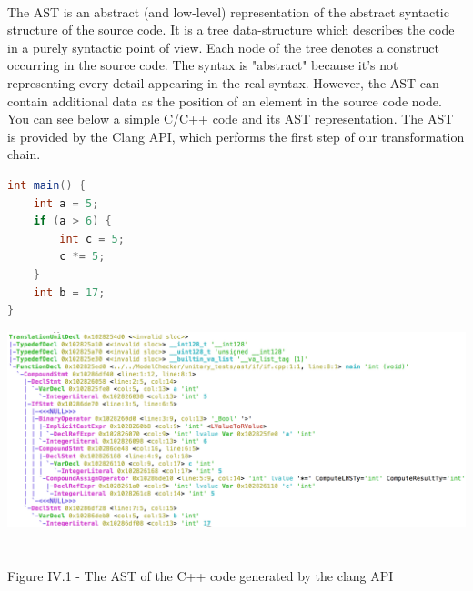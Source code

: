 \documentclass{report}
\begin{document}
\paragraph{}
\hspace{4mm}\textnormal{The \textsc{AST} is an abstract (and low-level) representation of the 
abstract  syntactic structure of the source code.
It is a tree data-structure which describes the code in a purely 
syntactic point of view. Each node of the tree denotes a
 construct occurring in the source code. The syntax is "abstract" 
because it's not representing  every detail appearing in the real syntax. 
However, the \textsc{AST} can contain additional data as the position of 
an element in the source code node.
You can see below a
 simple \textsc{C/C++} code and its AST representation. 
The \textsc{AST} is provided by the Clang API, which performs the first step
 of our transformation chain.}

\begin{lstlisting}[language=java]
int main() {
    int a = 5;
    if (a > 6) {
        int c = 5;
        c *= 5;
    }
    int b = 17;
}
\end{lstlisting}
\begin{center}
\includegraphics[scale=0.6]{data/ifClang.png}
~\\~\\Figure IV.1 - The AST of the C++ code generated by the clang API
\end{center}
\end{document}
